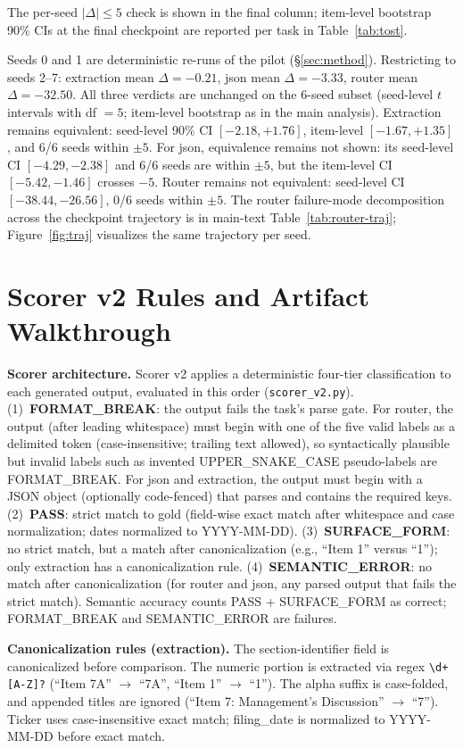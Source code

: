The per-seed $|\Delta| \le 5$ check is shown in the final column; item-level bootstrap 90\% CIs at the final checkpoint are reported per task in Table~\ref{tab:tost}.

Seeds 0 and 1 are deterministic re-runs of the pilot (\S\ref{sec:method}). Restricting to seeds 2--7: extraction mean $\Delta = -0.21$, json mean $\Delta = -3.33$, router mean $\Delta = -32.50$. All three verdicts are unchanged on the 6-seed subset (seed-level $t$ intervals with df $= 5$; item-level bootstrap as in the main analysis). Extraction remains equivalent: seed-level 90\% CI $[-2.18, +1.76]$, item-level $[-1.67, +1.35]$, and 6/6 seeds within $\pm5$. For json, equivalence remains not shown: its seed-level CI $[-4.29, -2.38]$ and 6/6 seeds are within $\pm5$, but the item-level CI $[-5.42, -1.46]$ crosses $-5$. Router remains not equivalent: seed-level CI $[-38.44, -26.56]$, 0/6 seeds within $\pm5$. The router failure-mode decomposition across the checkpoint trajectory is in main-text Table~\ref{tab:router-traj}; Figure~\ref{fig:traj} visualizes the same trajectory per seed.

\section{Scorer v2 Rules and Artifact Walkthrough}
\label{app:scorer}
\textbf{Scorer architecture.} Scorer v2 applies a deterministic four-tier classification to each generated output, evaluated in this order (\texttt{scorer\_v2.py}). (1)~\textbf{FORMAT\_BREAK}: the output fails the task's parse gate. For router, the output (after leading whitespace) must begin with one of the five valid labels as a delimited token (case-insensitive; trailing text allowed), so syntactically plausible but invalid labels such as invented UPPER\_SNAKE\_CASE pseudo-labels are FORMAT\_BREAK. For json and extraction, the output must begin with a JSON object (optionally code-fenced) that parses and contains the required keys. (2)~\textbf{PASS}: strict match to gold (field-wise exact match after whitespace and case normalization; dates normalized to YYYY-MM-DD). (3)~\textbf{SURFACE\_FORM}: no strict match, but a match after canonicalization (e.g., ``Item 1'' versus ``1''); only extraction has a canonicalization rule. (4)~\textbf{SEMANTIC\_ERROR}: no match after canonicalization (for router and json, any parsed output that fails the strict match). Semantic accuracy counts PASS $+$ SURFACE\_FORM as correct; FORMAT\_BREAK and SEMANTIC\_ERROR are failures.

\textbf{Canonicalization rules (extraction).} The section-identifier field is canonicalized before comparison. The numeric portion is extracted via regex \verb|\d+[A-Z]?| (``Item 7A'' $\to$ ``7A'', ``Item 1'' $\to$ ``1''). The alpha suffix is case-folded, and appended titles are ignored (``Item 7: Management's Discussion'' $\to$ ``7''). Ticker uses case-insensitive exact match; filing\_date is normalized to YYYY-MM-DD before exact match.

